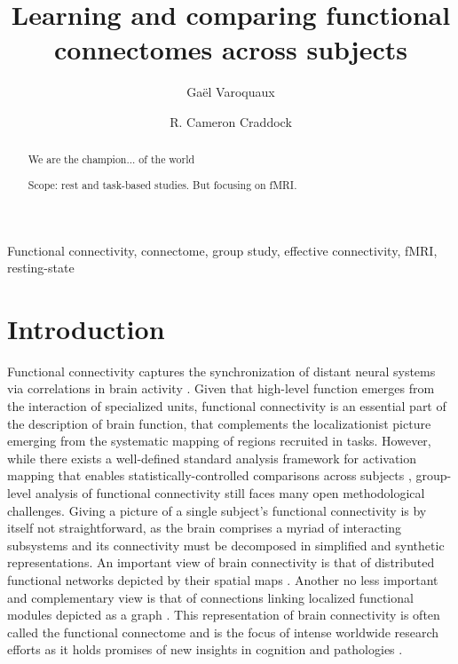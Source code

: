 \documentclass[5p]{elsarticle}
\begin{document}
\title{Learning and comparing functional connectomes across subjects}


\author[parietal,unicog,cea]{Ga\"el Varoquaux}
\author[cmi,nki]{R. Cameron Craddock}


\address[parietal]{Parietal project-team, INRIA Saclay-\^ile de France}
\address[unicog]{INSERM, U992}
\address[cea]{CEA/Neurospin b\^at 145, 91191 Gif-Sur-Yvette}
\address[cmi]{Child Mind Institute, New York, New York}
\address[nki]{Nathan Kline Institute for Psychiatric Research, Orangeburg, New York}

\begin{abstract}
    We are the champion... of the world

    Scope: rest and task-based studies. But focusing on fMRI.
\end{abstract}

\begin{keyword}
    Functional connectivity, connectome, group study, effective
    connectivity, fMRI, resting-state
\end{keyword}

\maketitle

\sloppy %

\section{Introduction}

Functional connectivity captures the synchronization of distant
neural systems via correlations in brain activity
\cite{biswal1995,cordes2000}. Given that high-level
function emerges from the interaction of specialized units, functional
connectivity is an essential part of the description of brain function,
that complements the localizationist picture emerging from the systematic
mapping of regions recruited in tasks. However, while there exists a
well-defined standard analysis framework for activation mapping that enables
statistically-controlled comparisons across subjects \cite{friston1995},
group-level analysis of functional connectivity still faces many open
methodological challenges. Giving a picture of a single subject's 
functional connectivity is by itself not straightforward, as the brain
comprises a myriad of interacting subsystems and its connectivity must 
be decomposed in
simplified and synthetic representations. An important view of brain
connectivity is that of distributed functional networks depicted by their
spatial maps \cite{fox2005}. Another no less important and complementary
view is that of connections linking localized functional modules depicted
as a graph \cite{bullmore2009}. This representation of brain connectivity
is often called the functional connectome \cite{sporns2005} and is the
focus of intense worldwide research efforts as it holds promises of new
insights in cognition and pathologies
\cite{greicius2008b,biswal2010,fox2010}.
\end{document}
